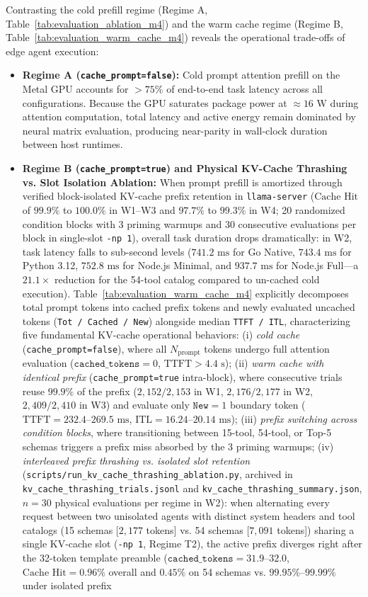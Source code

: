 \documentclass[preprint,12pt,3p]{elsarticle}
\begin{document}
Contrasting the cold prefill regime (Regime A, Table~\ref{tab:evaluation_ablation_m4}) and the warm cache regime (Regime B, Table~\ref{tab:evaluation_warm_cache_m4}) reveals the operational trade-offs of edge agent execution:
\begin{itemize}
    \item \textbf{Regime A (\texttt{cache\_prompt=false}):} Cold prompt attention prefill on the Metal GPU accounts for $>75\%$ of end-to-end task latency across all configurations. Because the GPU saturates package power at $\approx 16\text{ W}$ during attention computation, total latency and active energy remain dominated by neural matrix evaluation, producing near-parity in wall-clock duration between host runtimes.
    \item \textbf{Regime B (\texttt{cache\_prompt=true}) and Physical KV-Cache Thrashing vs. Slot Isolation Ablation:} When prompt prefill is amortized through verified block-isolated KV-cache prefix retention in \texttt{llama-server} ($\text{Cache Hit}$ of $99.9\%$ to $100.0\%$ in W1--W3 and $97.7\%$ to $99.3\%$ in W4; 20 randomized condition blocks with 3 priming warmups and 30 consecutive evaluations per block in single-slot \texttt{-np 1}), overall task duration drops dramatically: in W2, task latency falls to sub-second levels ($741.2\text{ ms}$ for Go Native, $743.4\text{ ms}$ for Python 3.12, $752.8\text{ ms}$ for Node.js Minimal, and $937.7\text{ ms}$ for Node.js Full---a $21.1\times$ reduction for the 54-tool catalog compared to un-cached cold execution). Table~\ref{tab:evaluation_warm_cache_m4} explicitly decomposes total prompt tokens into cached prefix tokens and newly evaluated uncached tokens (\texttt{Tot / Cached / New}) alongside median \texttt{TTFT / ITL}, characterizing five fundamental KV-cache operational behaviors: (i) \textit{cold cache} (\texttt{cache\_prompt=false}), where all $N_{\text{prompt}}$ tokens undergo full attention evaluation ($\texttt{cached\_tokens}=0$, $\text{TTFT} > 4.4\text{ s}$); (ii) \textit{warm cache with identical prefix} (\texttt{cache\_prompt=true} intra-block), where consecutive trials reuse $99.9\%$ of the prefix ($2{,}152 / 2{,}153$ in W1, $2{,}176 / 2{,}177$ in W2, $2{,}409 / 2{,}410$ in W3) and evaluate only $\texttt{New}=1$ boundary token ($\text{TTFT} = 232.4\text{--}269.5\text{ ms}$, $\text{ITL} = 16.24\text{--}20.14\text{ ms}$); (iii) \textit{prefix switching across condition blocks}, where transitioning between 15-tool, 54-tool, or Top-5 schemas triggers a prefix miss absorbed by the 3 priming warmups; (iv) \textit{interleaved prefix thrashing vs. isolated slot retention} (\texttt{scripts/run\_kv\_cache\_thrashing\_ablation.py}, archived in \texttt{kv\_cache\_thrashing\_trials.jsonl} and \texttt{kv\_cache\_thrashing\_summary.json}, $n=30$ physical evaluations per regime in W2): when alternating every request between two unisolated agents with distinct system headers and tool catalogs (15 schemas [$2{,}177$ tokens] vs. 54 schemas [$7{,}091$ tokens]) sharing a single KV-cache slot (\texttt{-np 1}, Regime T2), the active prefix diverges right after the 32-token template preamble ($\texttt{cached\_tokens} = 31.9\text{--}32.0$, $\text{Cache Hit} = 0.96\%$ overall and $0.45\%$ on 54 schemas vs. $99.95\%\text{--}99.99\%$ under isolated prefix 
\end{itemize}
\end{document}
